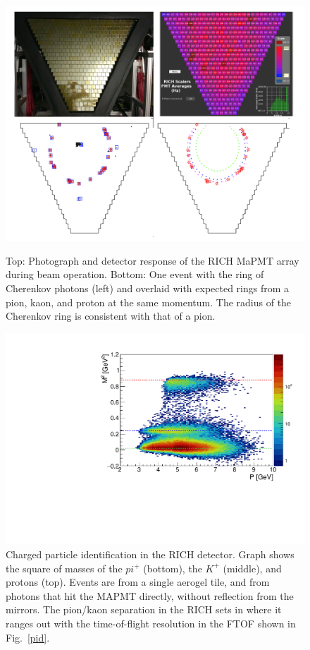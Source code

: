 \documentclass[final,3p,twocolumn]{elsarticle}
\begin{document}
\begin{figure}[t!]
\centerline{\includegraphics[width=1.0\columnwidth]{rich-event.png}}
\caption{Top: Photograph and detector response of the RICH MaPMT array during beam operation. Bottom: One
event with the ring of Cherenkov photons (left) and overlaid with expected rings from a pion, kaon, and proton at
the same momentum. The radius of the Cherenkov ring is consistent with that of a pion.}
\label{rich-event}
\vspace{0.3cm}\centerline{\includegraphics[width=1.0\columnwidth]{mass_PID.pdf}}
\caption{Charged particle identification in the RICH detector. Graph shows the square of 
masses of the $pi^+$ (bottom), the $K^+$ (middle), and protons (top). Events are from a single aerogel tile, and 
from photons that hit the MAPMT directly, without reflection from the mirrors.  
The pion/kaon separation in the RICH sets in where it ranges out with the time-of-flight resolution in the 
FTOF shown in Fig.~\ref{pid}.}
\label{rich_rec}
\end{figure}
\end{document}
